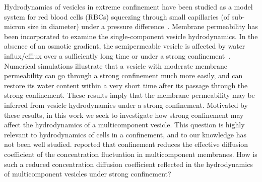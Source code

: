 \documentclass[twoside,twocolumn,9pt]{article}
\begin{document}
%
%
%

Hydrodynamics of vesicles in extreme confinement have been studied as a
model system for red blood cells (RBCs) squeezing through small
capillaries (of sub-micron size in diameter) under a pressure
difference~\cite{Freund2013_PoF, LuPeng2019_PoF, che-lyu-jae-leo2020,
gur-pak-tay-siv-sac2023}. Membrane permeability has been incorporated to
examine the single-component vesicle hydrodynamics. In the absence of an
osmotic gradient, the semipermeable vesicle is affected by water
influx/efflux over a sufficiently long time or under a strong
confinement~\cite{qua-gan-you2021}. Numerical simulations illustrate
that a vesicle with moderate membrane permeability can go through a
strong confinement much more easily, and can restore its water content
within a very short time after its passage through the strong
confinement. These results imply that the membrane permeability may be
inferred from vesicle hydrodynamics under a strong confinement.
Motivated by these results, in this work we seek to investigate how
strong confinement may affect the hydrodynamics of a multicomponent
vesicle. This question is highly relevant to hydrodynamics of cells in a
confinement, and to our knowledge has not been well studied.
\citet{ram-kom-sek-ima2010} reported that confinement reduces the
effective diffusion coefficient of the concentration fluctuation in
multicomponent membranes. How is such a reduced concentration diffusion
coefficient reflected in the hydrodynamics of multicomponent vesicles
under strong confinement?
\end{document}
